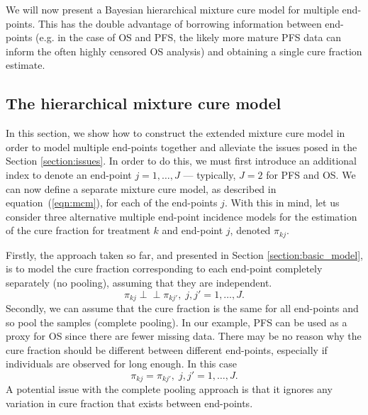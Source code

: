 \documentclass[AMA,STIX1COL]{WileyNJD-v2}
\begin{document}
We will now present a Bayesian hierarchical mixture cure model for multiple end-points.
This has the double advantage of borrowing information between end-points
(e.g. in the case of OS and PFS, the likely more mature PFS data can inform the often highly censored OS analysis) and obtaining a single cure fraction estimate.

%
\subsection{The hierarchical mixture cure model} \label{section:hier_model}
In this section, we show how to construct the extended mixture cure model in order to model multiple end-points together and alleviate the issues posed in the Section \ref{section:issues}.
In order to do this, we must first introduce an additional index to denote an end-point $j = 1, \ldots, J$ --- typically, $J=2$ for PFS and OS.
We can now define a separate mixture cure model, as described in equation~(\ref{eqn:mcm}), for each of the end-points $j$.
With this in mind, let us consider three alternative multiple end-point incidence models for the estimation of the cure fraction for treatment $k$ and end-point $j$, denoted $\pi_{kj}$.

Firstly, the approach taken so far, and presented in Section \ref{section:basic_model}, is to model the cure fraction corresponding to each end-point completely separately (no pooling), assuming that they are independent.
$$
\pi_{kj} \perp\!\!\!\perp \pi_{kj'}, \; j,j' = 1, \ldots, J.
$$
Secondly, we can assume that the cure fraction is the same for all end-points and so pool the samples (complete pooling).
In our example, PFS can be used as a proxy for OS since there are fewer missing data.
There may be no reason why the cure fraction should be different between different end-points, especially if individuals are observed for long enough.
In this case
$$
\pi_{kj} = \pi_{kj'}, \; j,j' = 1, \ldots, J.
$$
A potential issue with the complete pooling approach is that it ignores any variation in cure fraction that exists between end-points.
\end{document}
